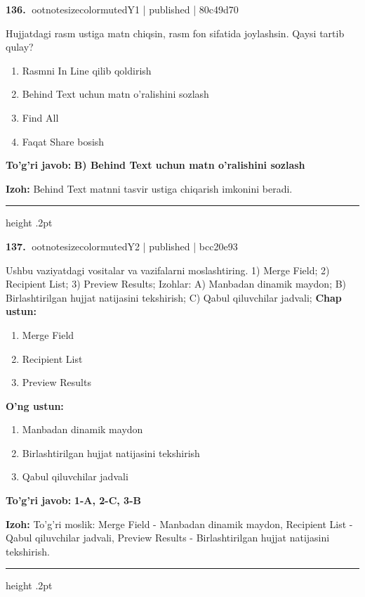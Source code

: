 \documentclass[10pt,a4paper]{article}
\begin{document}
\textbf{\color{ink}136.} {ootnotesizecolor{muted}Y1 | published | 80c49d70}
\par
Hujjatdagi rasm ustiga matn chiqsin, rasm fon sifatida joylashsin. Qaysi tartib qulay?
\begin{enumerate}[label=\Alph*),leftmargin=9mm]
\item Rasmni In Line qilib qoldirish
\item Behind Text uchun matn o'ralishini sozlash
\item Find All
\item Faqat Share bosish
\end{enumerate}
\begin{tcolorbox}[enhanced,breakable,colback=teal!4,colframe=teal!55!black,boxrule=0.45pt,arc=1.2mm,left=2.8mm,right=2.8mm,top=2mm,bottom=2mm]
\textbf{\color{teal}To'g'ri javob:} \textbf{B) Behind Text uchun matn o'ralishini sozlash}
\par\smallskip
\textbf{Izoh:} Behind Text matnni tasvir ustiga chiqarish imkonini beradi.
\end{tcolorbox}
\vspace{2mm}\hrule height .2pt\vspace{2mm}

\textbf{\color{ink}137.} {ootnotesizecolor{muted}Y2 | published | bcc20e93}
\par
Ushbu vaziyatdagi vositalar va vazifalarni moslashtiring.  1) Merge Field;  2) Recipient List;  3) Preview Results;  Izohlar: A) Manbadan dinamik maydon;  B) Birlashtirilgan hujjat natijasini tekshirish;  C) Qabul qiluvchilar jadvali;
\textbf{Chap ustun:}\begin{enumerate}[label=\arabic*),leftmargin=9mm]
\item Merge Field
\item Recipient List
\item Preview Results
\end{enumerate}
\textbf{O'ng ustun:}\begin{enumerate}[label=\Alph*),leftmargin=9mm]
\item Manbadan dinamik maydon
\item Birlashtirilgan hujjat natijasini tekshirish
\item Qabul qiluvchilar jadvali
\end{enumerate}
\begin{tcolorbox}[enhanced,breakable,colback=teal!4,colframe=teal!55!black,boxrule=0.45pt,arc=1.2mm,left=2.8mm,right=2.8mm,top=2mm,bottom=2mm]
\textbf{\color{teal}To'g'ri javob:} \textbf{1-A, 2-C, 3-B}
\par\smallskip
\textbf{Izoh:} To'g'ri moslik: Merge Field - Manbadan dinamik maydon, Recipient List - Qabul qiluvchilar jadvali, Preview Results - Birlashtirilgan hujjat natijasini tekshirish.
\end{tcolorbox}
\vspace{2mm}\hrule height .2pt\vspace{2mm}
\end{document}
